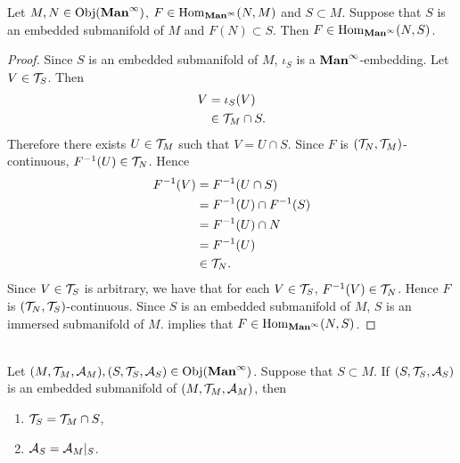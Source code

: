 \documentclass{book}
\begin{document}
	\begin{ex}
		Let $M, N \in \operatorname{Obj}(\operatorname*{\text{\textbf{Man}}^{\infty}})$, $F \in \operatorname{Hom}_{\operatorname*{\text{\textbf{Man}}^{\infty}}}(N, M)$ and $S \subset M$. Suppose that $S$ is an embedded submanifold of $M$ and $F(N) \subset S$. Then $F \in \operatorname{Hom}_{\operatorname*{\text{\textbf{Man}}^{\infty}}}(N, S)$.
	\end{ex}

	\begin{proof}
		Since $S$ is an embedded submanifold of $M$, $\iota_S$ is a $\operatorname*{\text{\textbf{Man}}^{\infty}}$-embedding. Let $V \in \mathcal{T}_S$. Then 
		\begin{align*}
			V
			& = \iota_S(V) \\
			& \in \mathcal{T}_M \cap S.
		\end{align*} 
		Therefore there exists $U \in \mathcal{T}_M$ such that $V = U \cap S$. Since $F$ is $(\mathcal{T}_N, \mathcal{T}_M)$-continuous, $F^{-1}(U) \in \mathcal{T}_N$. Hence  
		\begin{align*}
			F^{-1}(V)
			& = F^{-1}(U \cap S) \\
			& = F^{-1}(U) \cap F^{-1}(S) \\
			& = F^{-1}(U) \cap N \\
			& = F^{-1}(U) \\
			& \in \mathcal{T}_N.
		\end{align*}
		Since $V \in \mathcal{T}_S$ is arbitrary, we have that for each $V \in \mathcal{T}_S$, $F^{-1}(V) \in \mathcal{T}_N$. Hence $F$ is $(\mathcal{T}_N, \mathcal{T}_S)$-continuous. Since $S$ is an embedded submanifold of $M$, $S$ is an immersed submanifold of $M$.   implies that $F \in \operatorname{Hom}_{\operatorname*{\text{\textbf{Man}}^{\infty}}}(N, S)$.
	\end{proof}

	\begin{ex}  \\
		Let $(M, \mathcal{T}_M, \mathcal{A}_M), (S, \mathcal{T}_S, \mathcal{A}_S) \in \operatorname{Obj}(\operatorname*{\text{\textbf{Man}}^{\infty}})$. Suppose that $S \subset M$. If $(S, \mathcal{T}_S, \mathcal{A}_S)$ is an embedded submanifold of $(M, \mathcal{T}_M, \mathcal{A}_M)$, then 
		\begin{enumerate}
			\item $\mathcal{T}_S = \mathcal{T}_M \cap S$,
			\item $\mathcal{A}_S = \mathcal{A}_M|_S$.
		\end{enumerate}
	\end{ex}
\end{document}
